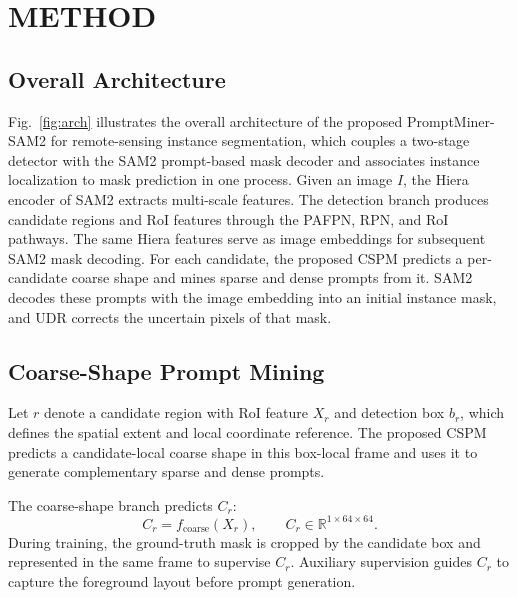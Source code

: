 \documentclass{article}
\begin{document}
\section{METHOD}
\subsection{Overall Architecture}
Fig.~\ref{fig:arch} illustrates the overall architecture of the proposed PromptMiner-SAM2 for remote-sensing instance segmentation, which couples a two-stage detector with the SAM2 prompt-based mask decoder and associates instance localization to mask prediction in one process.
Given an image $I$, the Hiera encoder of SAM2 extracts multi-scale features. The detection branch produces candidate regions and RoI features through the PAFPN, RPN, and RoI pathways. The same Hiera features serve as image embeddings for subsequent SAM2 mask decoding.
For each candidate, the proposed CSPM predicts a per-candidate coarse shape and mines sparse and dense prompts from it. SAM2 decodes these prompts with the image embedding into an initial instance mask, and UDR corrects the uncertain pixels of that mask.
\vspace{-0.3\baselineskip}
\subsection{Coarse-Shape Prompt Mining}
 Let $r$ denote a candidate region with RoI feature $X_r$ and detection box $b_r$, which defines the spatial extent and local coordinate reference. The proposed CSPM predicts a candidate-local coarse shape in this box-local frame and uses it to generate complementary sparse and dense prompts.

\indent The coarse-shape branch predicts $C_r$:
\begin{equation}
C_r=f_{\mathrm{coarse}}(X_r),\qquad C_r\in\mathbb{R}^{1\times64\times64}.
\label{eq:coarse}
\end{equation}
\indent During training, the ground-truth mask is cropped by the candidate box and represented in the same frame to supervise $C_r$. Auxiliary supervision guides $C_r$ to capture the foreground layout before prompt generation.
\end{document}
